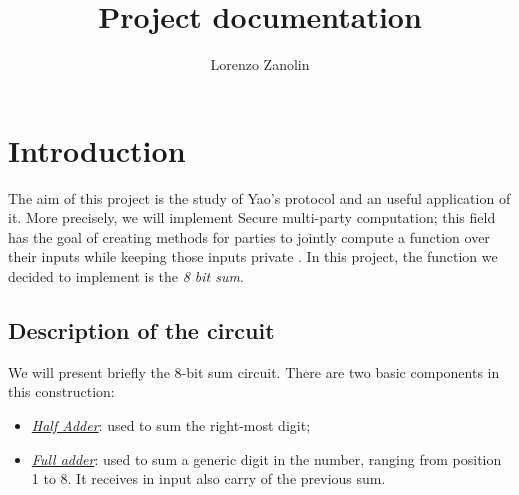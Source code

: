 \documentclass[12pt]{article}
\title{Project documentation}
\author{Lorenzo Zanolin}
\begin{document}
\maketitle

\section{Introduction}
The aim of this project is the study of Yao's protocol \cite{yao} and an useful application of it. More precisely, we will implement Secure multi-party computation; this field has the goal of creating methods for parties to jointly compute a function over their inputs while keeping those inputs private \cite{mpc}. In this project, the function we decided to implement is the \textit{8 bit sum}.

\subsection{Description of the circuit}
We will present briefly the 8-bit sum circuit. There are two basic components in this construction:
\begin{itemize}
    \item \textit{\hyperref[half]{Half Adder}}: used to sum the right-most digit;
    \item \textit{\hyperref[full]{Full adder}}:  used to sum a generic digit in the number, ranging from position 1 to 8. It receives in input also carry of the previous sum.
\end{itemize}
\end{document}
